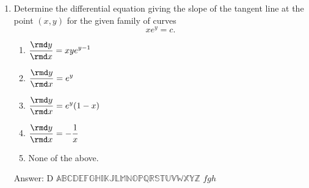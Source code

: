 \begin{enumerate}
\item Determine the differential equation giving the slope of the tangent
  line at the point $(x,y)$ for the given family of curves
  $$xe^y=c.$$
\begin{enumerate}[label=\alph*)]
\item $\displaystyle\frac{\rmd y}{\rmd x}=xye^{y-1}$ \\
\item $\displaystyle\frac{\rmd y}{\rmd x}=e^y$ \\
\item $\displaystyle\frac{\rmd y}{\rmd x}=e^y(1-x)$ \\
\item $\displaystyle\frac{\rmd y}{\rmd x}=-\frac{1}{x}$ \\
\item None of the above.
\end{enumerate}
Answer: D
\vspace{2.3 in}
$\mathbb{ABCDEFGHIKJLMNOPQRSTUVWXYZ}$ $fgh$
\end{enumerate}

